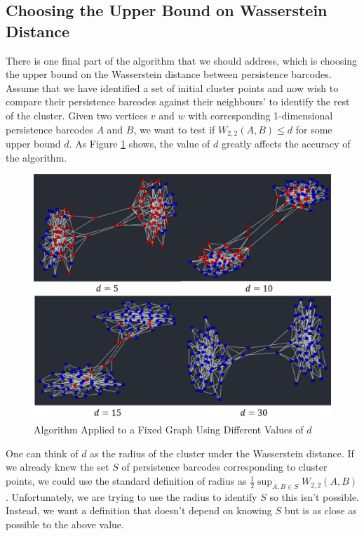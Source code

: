 \documentclass[12pt,a4paper]{amsart}
\numberwithin{equation}{section}
\theoremstyle{plain}
\theoremstyle{definition}
\begin{document}
\subsection*{Choosing the Upper Bound on Wasserstein Distance}

There is one final part of the algorithm that we should address, which is choosing the upper bound on the Wasserstein distance between persistence barcodes. Assume that we have identified a set of initial cluster points and now wish to compare their persistence barcodes against their neighbours' to identify the rest of the cluster. Given two vertices $v$ and $w$ with corresponding 1-dimensional persistence barcodes $A$ and $B$, we want to test if $W_{2,2}(A,B) \leq d$ for some upper bound $d$. As Figure \ref{upperBound} shows, the value of $d$ greatly affects the accuracy of the algorithm.

\begin{figure}[h]
	\centering
	\includegraphics[scale=0.6]{UpperBound.jpg}
	\caption{Algorithm Applied to a Fixed Graph Using Different Values of $d$}
	\label{upperBound}
\end{figure}

\newpage

One can think of $d$ as the radius of the cluster under the Wasserstein distance. If we already knew the set $S$ of persistence barcodes corresponding to cluster points, we could use the standard definition of radius as $\frac{1}{2}\sup_{A,B \in S} W_{2,2}(A,B)$. Unfortunately, we are  trying to use the radius to identify $S$ so this isn't possible. Instead, we want a definition that doesn't depend on knowing $S$ but is as close as possible to the above value.
\end{document}
